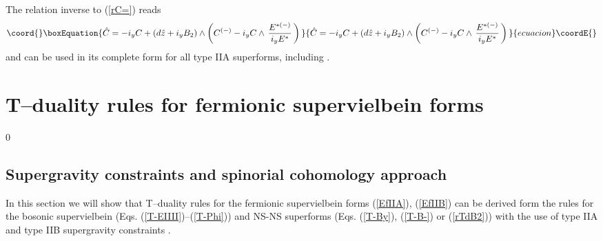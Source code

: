 \documentclass[a4paper,11pt]{article}
\begin{document}
The relation inverse to (\ref{rC=}) reads 
\begin{equation}\coord{}\boxEquation{\label{rhC=}
\hat{C} = - i_y C + (d\hat{z}+ i_yB_2)\wedge 
\left(C^{(-)}- i_y C \wedge \,
 {{E}^{ {*}(-)}\over i_{y}{E}^{ {*}}}\, \right)
\, 
}{\hat{C} = - i_y C + (d\hat{z}+ i_yB_2)\wedge 
\left(C^{(-)}- i_y C \wedge \,
 {{E}^{ {*}(-)}\over i_{y}{E}^{ {*}}}\, \right)
\, 
}{ecuacion}\coordE{}\end{equation}
and can be used in its complete form for all type IIA superforms, including 
\coordHE{}. 



\section{T--duality rules for fermionic supervielbein forms} 
\setcounter{equation}0

\subsection{Supergravity constraints and spinorial cohomology approach}

In this section we will show that  T--duality rules for the 
fermionic supervielbein forms 
(\ref{EfIIA}), (\ref{EfIIB}) can be derived 
form the rules for the bosonic supervielbein 
(Eqs. (\ref{T-EIIII})--(\ref{T-Phi})) and NS-NS superforms  
(Eqs. (\ref{T-By}), (\ref{T-B-}) or (\ref{rTdB2}))
with the use 
of \coordHE{} type IIA and type IIB supergravity constraints \cite{c0}. 
\end{document}
